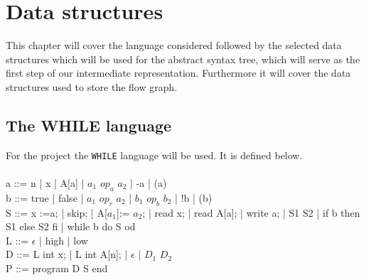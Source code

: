 \chapter{Data structures}
This chapter will cover the language considered followed by the selected data structures which will be used for the abstract syntax tree, which will serve as the first step of our intermediate representation. Furthermore it will cover the data structures used to store the flow graph.

\section{The WHILE language}
For the project the \texttt{WHILE} language will be used. It is defined below.
\\\\
a ::= n | x | A[a] | $a_1$ $op_a$ $a_2$ | -a | (a)\\
b ::= true | false | $a_1$ $op_r$ $a_2$ | $b_1$ $op_b$ $b_2$ | !b | (b)\\
S ::= x :=a; | skip; | A[$a_1$]:= $a_2$; | read x; | read A[a]; | write a; | S1 S2 | if b then S1 else S2 fi | while b do S od\\
L ::= $\epsilon$ | high | low\\
D ::= L int x; | L int A[n]; | $\epsilon$ | $D_1$ $D_2$\\
P ::= program D S end\\

